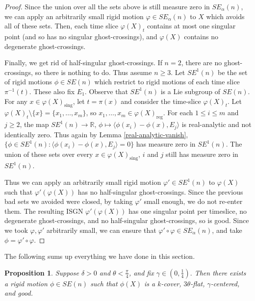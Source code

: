 \documentclass[11pt,reqno,twoside]{amsart}
\newcommand{\reg}{\mathrm{reg}}
\newcommand{\sing}{\mathrm{sing}}
\newtheorem{proposition}[lemma]{Proposition}
\theoremstyle{definition}
\begin{document}
\begin{proof}
Since the union over all the sets above is still measure zero in $SE_\alpha(n)$, we can apply an arbitrarily small rigid motion $\varphi \in SE_\alpha(n)$ to $X$ which avoids all of these sets. Then, each time slice $\varphi(X)_t$ contains at most one singular point (and so has no singular ghost-crossings), and $\varphi(X)$ contains no degenerate ghost-crossings. 

Finally, we get rid of half-singular ghost-crossings. If $n=2$, there are no ghost-crossings, so there is nothing to do. Thus assume $n \geq 3$. Let $SE^1(n)$ be the set of rigid motions $\phi \in SE(n)$ which restrict to rigid motions of each time slice $\pi^{-1}(t)$. These also fix $E_1$. Observe that $SE^1(n)$ is a Lie subgroup of $SE(n)$. For any $x \in \varphi(X)_\sing$, let $t = \pi(x)$ and consider the time-slice $\varphi(X)_t$. Let $\varphi(X)_t \setminus \{x\} = \{x_1,\ldots,x_m\}$, so $x_1,\ldots,x_m \in \varphi(X)_\reg.$ For each $1 \leq i \leq m$ and $j \geq 2$, the map $SE^1(n) \to \mathbb{R}$, $\phi \mapsto \langle \phi(x_i)-\phi(x),E_j\rangle$ is real-analytic and not identically zero. Thus again by Lemma \ref{real-analytic-vanish}, $\{\phi \in SE^1(n): \langle \phi(x_i) - \phi(x),E_j\rangle = 0\}$  has measure zero in $SE^1(n)$. The union of these sets over every $x \in \varphi(X)_\sing$, $i$ and $j$ still has measure zero in $SE^1(n)$. 

Thus we can apply an arbitrarily small rigid motion $\varphi' \in SE^1(n)$ to $\varphi(X)$ such that $\varphi'(\varphi(X))$ has no half-singular ghost-crossings. Since the previous bad sets we avoided were closed, by taking $\varphi'$ small enough, we do not re-enter them. The resulting ISGN $\varphi'(\varphi(X))$ has one singular point per timeslice, no degenerate ghost-crossings, and no half-singular ghost-crossings, so is good. Since we took $\varphi,\varphi'$ arbitrarily small, we can ensure that $\varphi' \circ \varphi \in SE_\alpha(n)$, and take $\phi = \varphi' \circ \varphi.$
\end{proof}

The following sums up everything we have done in this section.

\begin{proposition} \label{rotateX}
Suppose $\delta > 0$ and $\theta < \frac{\pi}{4}$, and fix $\gamma \in (0,\frac{1}{4}).$ Then there exists a rigid motion $\phi \in SE(n)$ such that $\phi(X)$ is a $k$-cover, $3\theta$-flat, $\gamma$-centered, and good.
\end{proposition}
\end{document}
